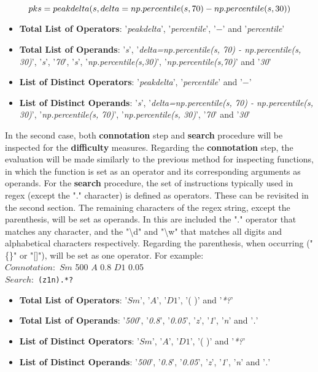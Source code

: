 \begin{equation}
\centering
pks = peakdelta(s, delta=np.percentile(s, 70) - np.percentile(s, 30))
\end{equation}


\begin{itemize}
\item \textbf{Total List of Operators}: '\textit{peakdelta}', '\textit{percentile}', '$-$' and '\textit{percentile}'
\item \textbf{Total List of Operands}: '\textit{s}', '\textit{delta=np.percentile(s, 70) - np.percentile(s, 30)}', '\textit{s}', '\textit{70}', '\textit{s}', '\textit{np.percentile(s,30)}', '\textit{np.percentile(s,70)}' and '\textit{30}'
\item \textbf{List of Distinct Operators}: '\textit{peakdelta}', '\textit{percentile}' and '$-$'
\item \textbf{List of Distinct Operands}: '\textit{s}', '\textit{delta=np.percentile(s, 70) - np.percentile(s, 30)}', '\textit{np.percentile(s, 70)}', '\textit{np.percentile(s, 30)}',  '\textit{70}' and '\textit{30}'
\end{itemize}

In the second case, both \textbf{connotation} step and \textbf{search} procedure will be inspected for the \textbf{difficulty} measures. Regarding the \textbf{connotation} step, the evaluation will be made similarly to the previous method for inspecting functions, in which the function is set as an operator and its corresponding arguments as operands. For the \textbf{search} procedure, the set of instructions typically used in \gls{regex} (except the "." character) is defined as operators\cite{regex}. These can be revisited in the second section. The remaining characters of the \gls{regex} string, except the parenthesis, will be set as operands. In this are included the "." operator that matches any character, and the "\textbackslash d" and "\textbackslash w" that matches all digits and alphabetical characters respectively. Regarding the parenthesis, when occurring ("\{\}" or "[]"), will be set as one operator. For example:\\

{\centering
\textbf{$Connotation: $} $Sm$ 500  $A$ 0.8 $D1$ 0.05\\
\textbf{$Search: $} \texttt{(z1n).*?}\\ }

\begin{itemize}
\item \textbf{Total List of Operators}: '$Sm$', '$A$', '$D1$', '( )' and '\textit{*?}'
\item \textbf{Total List of Operands}: '\textit{500}', '\textit{0.8}', '\textit{0.05}', '\textit{z}', '\textit{1}', '\textit{n}' and '\textit{.}'
\item \textbf{List of Distinct Operators}: '$Sm$', '$A$', '$D1$', '( )' and '\textit{*?}'
\item \textbf{List of Distinct Operands}: '\textit{500}', '\textit{0.8}', '\textit{0.05}', '\textit{z}', '\textit{1}', '\textit{n}' and '\textit{.}'
\end{itemize}


